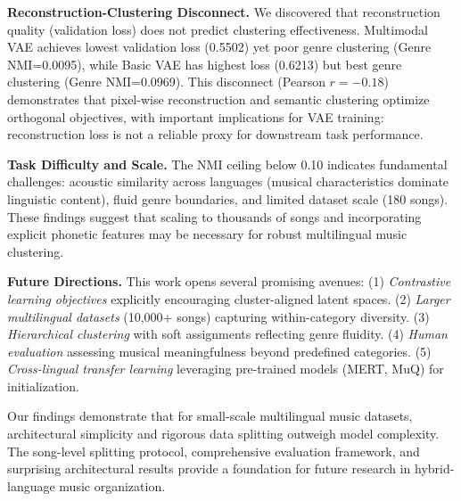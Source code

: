\documentclass[10pt,twocolumn]{article}
\begin{document}
\textbf{Reconstruction-Clustering Disconnect.} We discovered that reconstruction quality (validation loss) does not predict clustering effectiveness. Multimodal VAE achieves lowest validation loss (0.5502) yet poor genre clustering (Genre NMI=0.0095), while Basic VAE has highest loss (0.6213) but best genre clustering (Genre NMI=0.0969). This disconnect (Pearson $r=-0.18$) demonstrates that pixel-wise reconstruction and semantic clustering optimize orthogonal objectives, with important implications for VAE training: reconstruction loss is not a reliable proxy for downstream task performance.

\textbf{Task Difficulty and Scale.} The NMI ceiling below 0.10 indicates fundamental challenges: acoustic similarity across languages (musical characteristics dominate linguistic content), fluid genre boundaries, and limited dataset scale (180 songs). These findings suggest that scaling to thousands of songs and incorporating explicit phonetic features may be necessary for robust multilingual music clustering.

\textbf{Future Directions.} This work opens several promising avenues: (1) \emph{Contrastive learning objectives} explicitly encouraging cluster-aligned latent spaces. (2) \emph{Larger multilingual datasets} (10,000+ songs) capturing within-category diversity. (3) \emph{Hierarchical clustering} with soft assignments reflecting genre fluidity. (4) \emph{Human evaluation} assessing musical meaningfulness beyond predefined categories. (5) \emph{Cross-lingual transfer learning} leveraging pre-trained models (MERT, MuQ) for initialization.

Our findings demonstrate that for small-scale multilingual music datasets, architectural simplicity and rigorous data splitting outweigh model complexity. The song-level splitting protocol, comprehensive evaluation framework, and surprising architectural results provide a foundation for future research in hybrid-language music organization.

\FloatBarrier



\end{document}
